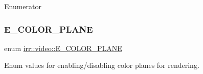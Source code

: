\begin{DoxyEnumFields}{Enumerator}
\end{DoxyEnumFields}
\mbox{\label{namespaceirr_1_1video_aa9f25191ae536c1a4b08ec5334866a21}} 
\subsubsection{\texorpdfstring{E\+\_\+\+C\+O\+L\+O\+R\+\_\+\+P\+L\+A\+NE}{E\_COLOR\_PLANE}\hspace{0.1cm}{\footnotesize\ttfamily [1/2]}}
{\footnotesize\ttfamily enum \hyperlink{namespaceirr_1_1video_aa9f25191ae536c1a4b08ec5334866a21}{irr\+::video\+::\+E\+\_\+\+C\+O\+L\+O\+R\+\_\+\+P\+L\+A\+NE}}



Enum values for enabling/disabling color planes for rendering. 

